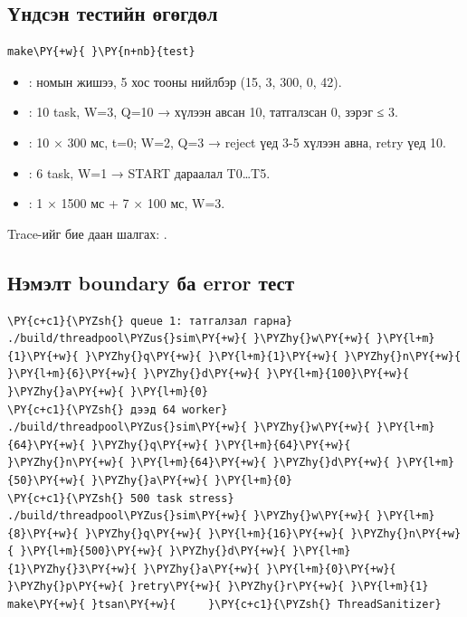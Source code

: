 \documentclass[12pt,a4paper]{article}
\begin{document}
\subsection{Үндсэн тестийн өгөгдөл}

\par\noindent\begin{minipage}{\linewidth}\setlength{\topsep}{1pt}\setlength{\partopsep}{0pt}
\begin{Verbatim}[commandchars=\\\{\}]
make\PY{+w}{ }\PY{n+nb}{test}
\end{Verbatim}
\end{minipage}

\begin{itemize}
  \item {}: номын жишээ, 5 хос тооны нийлбэр (15, 3, 300, 0, 42).
  \item {}: 10 task, W=3, Q=10 → хүлээн авсан 10, татгалзсан 0, зэрэг ≤ 3.
  \item {}: 10 × 300 мс, t=0; W=2, Q=3 → reject үед 3-5 хүлээн авна, retry үед 10.
  \item {}: 6 task, W=1 → START дараалал T0…T5.
  \item {}: 1 × 1500 мс + 7 × 100 мс, W=3.
\end{itemize}

Trace-ийг бие даан шалгах: .

\subsection{Нэмэлт boundary ба error тест}

\par\noindent\begin{minipage}{\linewidth}\setlength{\topsep}{1pt}\setlength{\partopsep}{0pt}
\begin{Verbatim}[commandchars=\\\{\}]
\PY{c+c1}{\PYZsh{} queue 1: татгалзал гарна}
./build/threadpool\PYZus{}sim\PY{+w}{ }\PYZhy{}w\PY{+w}{ }\PY{l+m}{1}\PY{+w}{ }\PYZhy{}q\PY{+w}{ }\PY{l+m}{1}\PY{+w}{ }\PYZhy{}n\PY{+w}{ }\PY{l+m}{6}\PY{+w}{ }\PYZhy{}d\PY{+w}{ }\PY{l+m}{100}\PY{+w}{ }\PYZhy{}a\PY{+w}{ }\PY{l+m}{0}
\PY{c+c1}{\PYZsh{} дээд 64 worker}
./build/threadpool\PYZus{}sim\PY{+w}{ }\PYZhy{}w\PY{+w}{ }\PY{l+m}{64}\PY{+w}{ }\PYZhy{}q\PY{+w}{ }\PY{l+m}{64}\PY{+w}{ }\PYZhy{}n\PY{+w}{ }\PY{l+m}{64}\PY{+w}{ }\PYZhy{}d\PY{+w}{ }\PY{l+m}{50}\PY{+w}{ }\PYZhy{}a\PY{+w}{ }\PY{l+m}{0}
\PY{c+c1}{\PYZsh{} 500 task stress}
./build/threadpool\PYZus{}sim\PY{+w}{ }\PYZhy{}w\PY{+w}{ }\PY{l+m}{8}\PY{+w}{ }\PYZhy{}q\PY{+w}{ }\PY{l+m}{16}\PY{+w}{ }\PYZhy{}n\PY{+w}{ }\PY{l+m}{500}\PY{+w}{ }\PYZhy{}d\PY{+w}{ }\PY{l+m}{1}\PYZhy{}3\PY{+w}{ }\PYZhy{}a\PY{+w}{ }\PY{l+m}{0}\PY{+w}{ }\PYZhy{}p\PY{+w}{ }retry\PY{+w}{ }\PYZhy{}r\PY{+w}{ }\PY{l+m}{1}
make\PY{+w}{ }tsan\PY{+w}{     }\PY{c+c1}{\PYZsh{} ThreadSanitizer}
\end{Verbatim}
\end{minipage}
\end{document}
